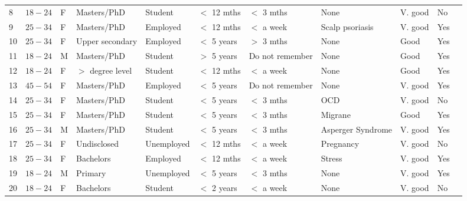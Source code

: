 \begin{landscape}
\begin{table}[t]
\begin{tabular}{p{0.75cm} p{1.25cm} p{1cm} p{2cm} p{2cm} p{2cm} p{3cm} p{2.5cm} p{2.5cm} p{1.5cm} p{1.5cm}}
    8	&   $18-24$	& F    &   Masters/PhD	            &   Student	    &  $<$ 12 mths     & $<$ 3 mths	    & None	                 & V. good	    & No     &                                      \\ 
    9	&   $25-34$	& F    &   Masters/PhD	            &   Employed	&  $<$ 12 mths     & $<$ a week	    & Scalp psoriasis	     & V. good	    & Yes    &                                      \\ 
    10	&   $25-34$	& F    &   Upper secondary	        &   Employed    &  $<$ 5 years     & $>$ 3 mths	    & None	                 & Good         & Yes    &                                      \\ 
    11	&   $18-24$	& M    &   Masters/PhD	            &   Student	    &  $>$ 5 years     & Do not remember	        & None	                 & Good	        & Yes    &                                      \\ 
    12	&   $18-24$	& F    &   $>$ degree level	        &   Student	    &  $<$ 12 mths     & $<$ a week	    & None	                 & Good	        & Yes    &                                      \\ 
    13	&   $45-54$	& F    &   Masters/PhD	            &   Employed    &  $<$ 5 years     & Do not remember	        & None	                 & V. good	    & Yes    &                                      \\ 
    14	&   $25-34$	& F    &   Masters/PhD	            &   Student	    &  $<$ 5 years     & $<$ 3 mths	    & OCD	                 & V. good	    & No     &                                      \\ 
    15	&   $25-34$	& F    &   Masters/PhD	            &   Student	    &  $<$ 5 years     & $<$ 3 mths	    & Migrane	             & Good	        & Yes    &                                      \\ 
    16	&   $25-34$	& M    &   Masters/PhD	            &   Student	    &  $<$ 5 years     & $<$ 3 mths	    & Asperger Syndrome	     & V. good	    & Yes    &                                      \\ 
    17	&   $25-34$	& F    &   Undisclosed	            &   Unemployed	&  $<$ 12 mths     & $<$ a week	    & Pregnancy	             & V. good	    & No     &                                      \\ 
    18	&   $25-34$	& F    &   Bachelors	            &   Employed	&  $<$ 12 mths     & $<$ a week	    & Stress	             & V. good	    & Yes    &                                      \\ 
    19	&   $18-24$	& M    &   Primary	                &   Unemployed	&  $<$ 5 years     & $<$ 3 mths	    & None	                 & V. good	    & Yes    &                                      \\ 
    20	&   $18-24$	& F    &   Bachelors	            &   Student	    &  $<$ 2 years     & $<$ a week	    & None	                 & V. good	    & No     &                                      \\ 
        

\end{tabular}
\end{table}
\end{landscape}
